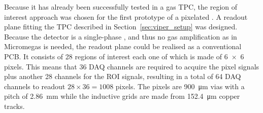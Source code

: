 Because it has already been successfully tested in a gas TPC, the region of interest approach was chosen for the first prototype of a pixelated \lartpc.
A readout plane fitting the TPC described in Section~\ref{sec:viper_setup} was designed.
Because the detector is a single-phase \lartpc, and thus no gas amplification as in Micromegas is needed, the readout plane could be realised as a conventional PCB.
It consists of \num{28} regions of interest each one of which is made of \num{6 x 6} pixels.
This means that \num{36} DAQ channels are required to acquire the pixel signals plus another \num{28} channels for the ROI signals, resulting in a total of \num{64} DAQ channels to readout $28 \times 36 = 1008$ pixels.
The pixels are \SI{900}{\micro\metre} vias with a pitch of \SI{2.86}{\milli\metre} while the inductive grids are made from \SI{152.4}{\micro\metre} copper tracks.